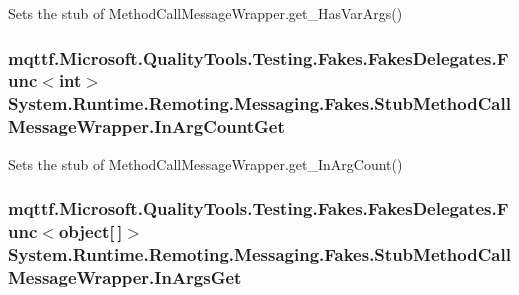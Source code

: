 Sets the stub of Method\-Call\-Message\-Wrapper.\-get\-\_\-\-Has\-Var\-Args()

\hypertarget{class_system_1_1_runtime_1_1_remoting_1_1_messaging_1_1_fakes_1_1_stub_method_call_message_wrapper_a31365bcb74f00e76dabb35f3b726d949}{
\subsubsection[{In\-Arg\-Count\-Get}]{\setlength{\rightskip}{0pt plus 5cm}mqttf.\-Microsoft.\-Quality\-Tools.\-Testing.\-Fakes.\-Fakes\-Delegates.\-Func$<$int$>$ System.\-Runtime.\-Remoting.\-Messaging.\-Fakes.\-Stub\-Method\-Call\-Message\-Wrapper.\-In\-Arg\-Count\-Get}}\label{class_system_1_1_runtime_1_1_remoting_1_1_messaging_1_1_fakes_1_1_stub_method_call_message_wrapper_a31365bcb74f00e76dabb35f3b726d949}


Sets the stub of Method\-Call\-Message\-Wrapper.\-get\-\_\-\-In\-Arg\-Count()

\hypertarget{class_system_1_1_runtime_1_1_remoting_1_1_messaging_1_1_fakes_1_1_stub_method_call_message_wrapper_aa873377063f6c926edc30e2556d0ad31}{
\subsubsection[{In\-Args\-Get}]{\setlength{\rightskip}{0pt plus 5cm}mqttf.\-Microsoft.\-Quality\-Tools.\-Testing.\-Fakes.\-Fakes\-Delegates.\-Func$<$object\mbox{[}$\,$\mbox{]}$>$ System.\-Runtime.\-Remoting.\-Messaging.\-Fakes.\-Stub\-Method\-Call\-Message\-Wrapper.\-In\-Args\-Get}}\label{class_system_1_1_runtime_1_1_remoting_1_1_messaging_1_1_fakes_1_1_stub_method_call_message_wrapper_aa873377063f6c926edc30e2556d0ad31}


